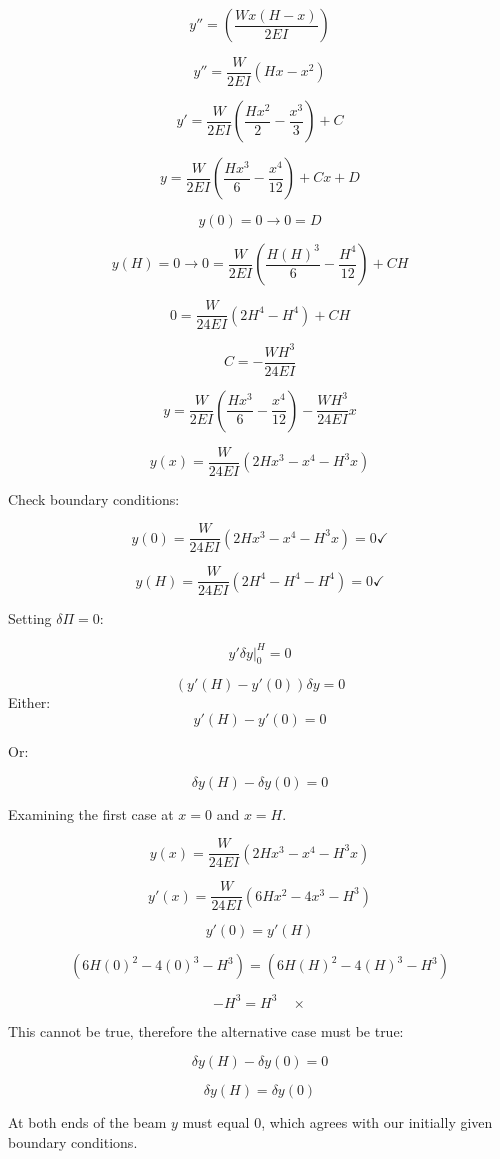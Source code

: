 \documentclass[../main.tex]{subfiles}
\begin{document}
\[
    y'' = \left({\frac{Wx(H-x)}{2EI}}\right)
\]

\[
    y'' = \frac{W}{2EI} \left({Hx-x^2}\right)
\]

\[
    y' =  \frac{W}{2EI} \left({\frac{Hx^2}{2} - \frac{x^3}{3}}\right) + C
\]

\[
    y =  \frac{W}{2EI} \left({\frac{Hx^3}{6} - \frac{x^4}{12}}\right) + Cx + D
\]

\[
    y(0) = 0 \rightarrow 0 = D
\]

\[
    y(H) = 0 \rightarrow 0 =  \frac{W}{2EI} \left({\frac{H(H)^3}{6} - \frac{H^4}{12}}\right) + CH
\]

\[
    0 =  \frac{W}{24EI} \left({2H^4 - H^4}\right) + CH
\]

\[
    C =  -\frac{WH^3}{24EI}
\]

\[
    y =  \frac{W}{2EI} \left({\frac{Hx^3}{6} - \frac{x^4}{12}}\right) -\frac{WH^3}{24EI} x
\]

\[  
    \boxed{
    y(x) =  \frac{W}{24EI} \left({2Hx^3 - x^4 - H^3 x}\right)
    }
\]

Check boundary conditions:

\[
    y(0) =  \frac{W}{24EI} \left({2Hx^3 - x^4 - H^3 x}\right) = 0 \checkmark    
\]

\[
    y(H) =  \frac{W}{24EI} \left({2H^4 - H^4 - H^4}\right) = 0 \checkmark
\]


Setting  \(\delta \Pi = 0\):

\[
    \left.{y'\delta y}\right|_0^H = 0
\]

\[
    (y'(H)-y'(0))\delta y = 0  
\]
Either:
\[
    y'(H) - y'(0) = 0 
\]

Or:

\[
    \delta y(H) - \delta y (0) = 0
\]

Examining the first case at \(x=0\) and \(x=H\). 

\[
    y(x) =  \frac{W}{24EI} \left({2Hx^3 - x^4 - H^3 x}\right)
\]

\[
    y'(x) =  \frac{W}{24EI} \left({6Hx^2 - 4x^3 - H^3}\right)
\]

\[
    y'(0) = y'(H)
\]

\[
    \left({6H(0)^2 - 4(0)^3 - H^3}\right) = \left({6H(H)^2 - 4(H)^3 - H^3}\right)
\]

\[
    -H^3 = H^3 \quad \times
\]

This cannot be true, therefore the alternative case must be true:

\[
    \delta y(H) - \delta y (0) = 0
\]

\[
    \delta y(H) = \delta y (0)
\]

At both ends of the beam \(y\) must equal 0, which agrees with our initially given boundary conditions. 
\end{document}
